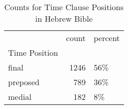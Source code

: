 \begin{table}[htbp!]
\centering
\caption{Counts for Time Clause Positions in Hebrew Bible}
\label{table:posi_cp}
\begin{tabular}{lrl}
\toprule
{} &  count & percent \\
Time Position &        &         \\
\midrule
final         &   1246 &     56\% \\
preposed      &    789 &     36\% \\
medial        &    182 &      8\% \\
\bottomrule
\end{tabular}
\end{table}
